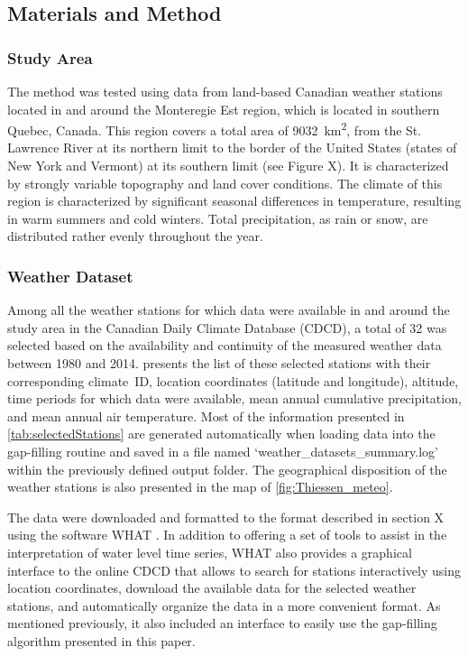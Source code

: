 \documentclass[TechnicalNoteMeteo.tex]{subfiles}
\begin{document}
\subsection{Materials and Method}

\subsubsection{Study Area}

The method was tested using data from land-based Canadian weather stations located in and around the Monteregie Est region, which is located in southern Quebec, Canada. This region covers a total area of \SI{9032}{km^2}, from the St. Lawrence River at its northern limit to the border of the United States (states of New York and Vermont) at its southern limit (see Figure X). It is characterized by strongly variable topography and land cover conditions. The climate of this region is characterized by significant seasonal differences in temperature, resulting in warm summers and cold winters. Total precipitation, as rain or snow, are distributed rather evenly throughout the year.

\subsubsection{Weather Dataset}

Among all the weather stations for which data were available in and around the study area in the Canadian Daily Climate Database (CDCD), a total of 32 was selected based on the availability and continuity of the measured weather data between 1980 and 2014.  presents the list of these selected stations with their corresponding climate~ID, location coordinates (latitude and longitude), altitude, time periods for which data were available, mean annual cumulative precipitation, and mean annual air temperature. Most of the information presented in \cref{tab:selectedStations} are generated automatically when loading data into the gap-filling routine and saved in a file named `weather\_datasets\_summary.log' within the previously defined output folder. The geographical disposition of the weather stations is also presented in the map of \cref{fig:Thiessen_meteo}.

The data were downloaded and formatted to the format described in section X using the software WHAT \citep{gosselin_user_2015}. In addition to offering a set of tools to assist in the interpretation of water level time series, WHAT also provides a graphical interface to the online CDCD that allows to search for stations interactively using location coordinates, download the available data for the selected weather stations, and automatically organize the data in a more convenient format. As mentioned previously, it also included an interface to easily use the gap-filling algorithm presented in this paper.
\end{document}
